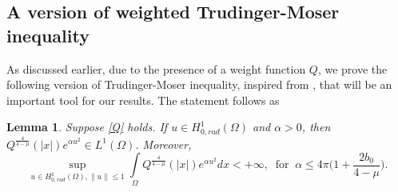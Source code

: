 \documentclass[11pt]{amsart}
\numberwithin{equation}{section}
\newtheorem{lem}[thm]{Lemma}
\newcommand{\hr}{H^1_{0, rad}(\Omega)}
\newcommand{\1}{\frac{1}{2}}
\begin{document}
	\subsection{A version of weighted Trudinger-Moser inequality}
	As discussed earlier, due to the presence of a weight function $Q$, we  prove the following version of Trudinger-Moser inequality, inspired from \cite{Albuquerque}, that will be an important tool for our results. The statement follows as
	\begin{lem} 
		\label{lem2.2}
		Suppose \eqref{Q} holds. If $u\in \hr$ and $\alpha>0$, then $Q^{\frac{4}{4-\mu}}(|x|)e^{\alpha u^2} \in L^1(\Omega)$. Moreover,
		\begin{equation*}
			\sup_{u\in \hr, \|u\| \leq 1} \int\limits_\Omega Q^{\frac{4}{4-\mu}}(|x|)e^{\alpha u^2}dx < +\infty, \ \text{ for } \ \alpha \leq 4\pi \Big( 1+ \frac{2b_0}{4-\mu}\Big).
		\end{equation*}
	\end{lem} 
\end{document}
